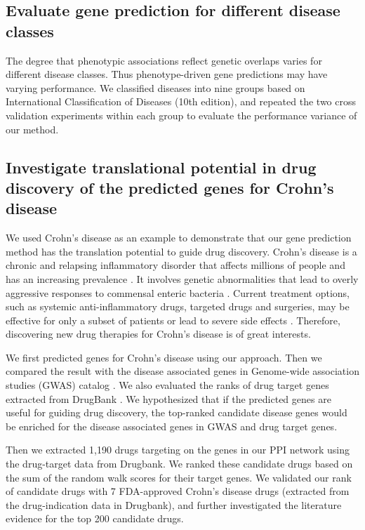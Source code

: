 \subsection{Evaluate gene prediction for different disease classes}
The degree that phenotypic associations reflect genetic overlaps
varies for different disease classes.
Thus phenotype-driven gene predictions may have varying performance.
We classified diseases into nine groups based on
International Classification of Diseases (10th edition),
and repeated the two cross validation experiments within each group
to evaluate the performance variance of our method.

\subsection{Investigate translational potential in drug discovery of the predicted genes for Crohn's disease}
We used Crohn’s disease as an example to demonstrate that our gene
prediction method has the translation potential to guide drug discovery.
Crohn's disease is a chronic and relapsing inflammatory disorder that affects millions
of people and has an increasing prevalence \cite{molodecky2012increasing}.
It involves genetic
abnormalities that lead to overly aggressive responses to commensal enteric
bacteria \cite{sartor2006mechanisms}. Current treatment options, such as systemic anti-inflammatory
drugs, targeted drugs and surgeries, may be effective for only a subset of
patients or lead to severe side effects \cite{baumgart2007inflammatory}. Therefore, discovering new drug
therapies for Crohn's disease is of great interests.

We first predicted genes for Crohn’s disease using our approach.
Then we compared the result with the disease associated genes
in Genome-wide association studies (GWAS) catalog \cite{hindorff2009potential}.
We also evaluated the ranks of drug target genes extracted from DrugBank \cite{law2014drugbank}.
We hypothesized that if the predicted genes are useful for guiding drug discovery,
the top-ranked candidate disease genes would be enriched for
the disease associated genes in GWAS and drug target genes.

Then we extracted 1,190 drugs targeting on the genes in our PPI network using
the drug-target data from Drugbank. We ranked these candidate drugs based on the
sum of the random walk scores for their target genes. We validated our
rank of candidate drugs with 7 FDA-approved Crohn’s disease drugs (extracted from the
drug-indication data in Drugbank), and further investigated the literature evidence
for the top 200 candidate drugs.



